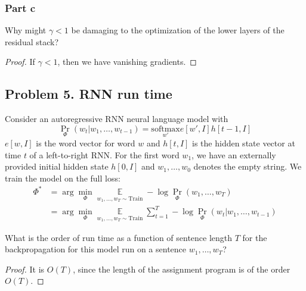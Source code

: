 \documentclass{amsart}
\DeclareMathOperator{\ee}{\mathbb{E}}
\theoremstyle{definition}
\begin{document}
\subsubsection*{Part c}
Why might $\gamma < 1$ be damaging to the optimization of the lower layers of the residual stack?
\begin{proof}
  If $\gamma < 1$, then we have vanishing gradients.
\end{proof}

\subsection*{Problem 5. RNN run time} Consider an autoregressive RNN neural language model with 
\[
\Pr_\Phi (w_t | w_1, \ldots, w_{t - 1}) = \underset{w'}{\mathrm{softmax}} e[w', I] h[t - 1, I]
\]
$e[w, I]$ is the word vector for word $w$ and $h[t, I]$ is the hidden state vector at time $t$ of a left-to-right RNN.
For the first word $w_1$, we have an externally provided initial hidden state $h[0, I]$ and $w_1, \ldots, w_0$ denotes the empty string. 
We train the model on the full loss:
\begin{align*}
  \Phi^\ast &= \arg\min_\Phi \underset{w_1, \ldots, w_T \sim \mathrm{Train}}{\ee} - \log \Pr_\Phi(w_1, \ldots, w_T) \\
  &= \arg\min_\Phi \underset{w_1, \ldots, w_T \sim \mathrm{Train}}{\ee} \sum_{t = 1}^T - \log \Pr_\Phi(w_t | w_1, \ldots, w_{t - 1})
\end{align*}

What is the order of run time as a function of sentence length $T$ for the backpropagation for this model run on a sentence $w_1, \ldots, w_T$?
\begin{proof}
  It is $O(T)$, since the length of the assignment program is of the order $O(T)$. 
\end{proof}
\end{document}
